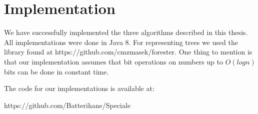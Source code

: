 \chapter{Implementation}
We have successfully implemented the three algorithms described in this thesis. All implementations were done in Java 8. For representing trees we used the library found at https://github.com/cmzmasek/forester. One thing to mention is that our implementation assumes that bit operations on numbers up to $O(logn)$ bits can be done in constant time. 

The code for our implementations is available at:

https://github.com/Batterihane/Speciale


